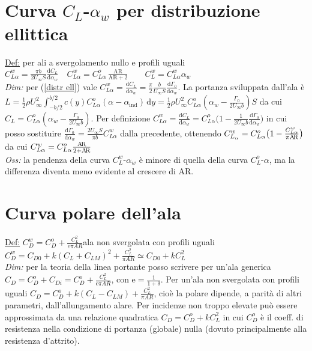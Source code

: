 \documentclass[11pt,a4paper]{report}
\newcommand{\de}{\mathrm d}
\begin{document}
	\section{Curva $C_L$-$\alpha_w$ per distribuzione ellittica}
	\underline{Def:} per ali a svergolamento nullo e profili uguali $C_{L\alpha}^w=\frac{\pi b}{2U_\infty S}\frac{\de C_L}{\de\alpha_w}\quad C_{L\alpha}^w=C_{L\alpha}^o\,\frac{\mathrm{A\!R}}{\mathrm{A\!R}+2}\qquad C_L^w=C_{L\alpha}^w\alpha_w$\\
	\textit{Dim:} per (\ref{distr ell}) vale $C_{L\alpha}^w=\frac{\mathrm dC_L}{\de\alpha_w}=\frac{\pi}2\frac{b}{U_\infty S}\frac{\de\Gamma_0}{\de\alpha_w}$. La portanza sviluppata dall'ala è $L=\frac 12\rho U_\infty^2\int_{-b/2}^{b/2}c(y)C_{L\alpha}^o(\alpha-\alpha_\mathrm{ind})\,\de y=\frac 12\rho U_\infty^2C_{L\alpha}^o(\alpha_w-\frac{\Gamma_0}{2U_\infty b})S$ da cui $C_L=C_{L\alpha}^o(\alpha_w-\frac{\Gamma_0}{2U_\infty b})$. Per definizione $C_{L\alpha}^w=\frac{\de C_L}{\de\alpha_w}=C_{L\alpha}^o\big(1-\frac 1{2U_\infty b}\frac{\de\Gamma_0}{\de\alpha_w}\big)$ in cui posso sostituire $\frac{\de\Gamma_0}{\de\alpha_w}=\frac{2U_\infty S}{\pi b}C_{L\alpha}^w$ dalla precedente, ottenendo $C_{L_\alpha}^w=C_{L\alpha}^o\big(1-\frac{C_{L\alpha}^w}{\pi\text{A\!R}}\big)$ da cui $C_{L\alpha}^w=C_{L\alpha}^o\frac{\text{A\!R}}{2+\text{A\!R}}$\\
	\textit{Oss:} la pendenza della curva $C_L^w$-$\alpha_w$ è minore di quella della curva $C_L^o$-$\alpha$, ma la differenza diventa meno evidente al crescere di A\!R.
	
	\section{Curva polare dell'ala}
	\underline{Def:} $C_D^w=C_D^o+\frac{C_L^2}{e\pi A\!R}$\qquad ala non svergolata con profili uguali $C_D^w=C_{D0}+k(C_L+C_{LM})^2+\frac{C_L^2}{\pi A\!R}\simeq C_{D0}+kC_L^2$\\
	\textit{Dim:} per la teoria della linea portante posso scrivere per un'ala generica $C_D=C_D^o+C_{Di}=C_D^o+\frac{C_L^2}{\mathrm e\pi A\!R}$, con $\mathrm e=\frac{1}{1+\delta}$. Per un'ala non svergolata con profili uguali $C_D=C_D^o+k(C_L-C_{LM})+\frac{C_L^2}{\pi A\!R}$, cioè la polare dipende, a parità di altri parametri, dall'allungamento alare. Per incidenze non troppo elevate può essere approssimata da una relazione quadratica $C_D=C_D^o+kC_L^2$ in cui $C_D^o$ è il coeff. di resistenza nella condizione di portanza (globale) nulla (dovuto principalmente alla resistenza d'attrito).
	
\end{document}
